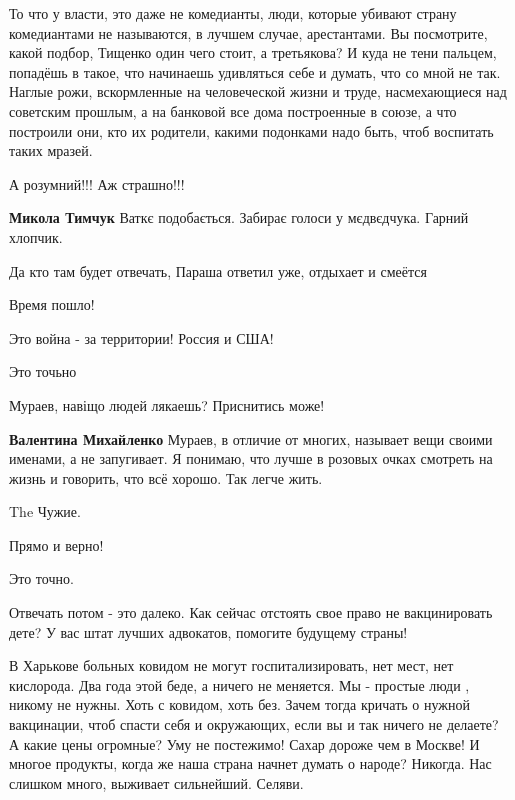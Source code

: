 \begin{itemize}
\begin{itemize}
\end{itemize} %


То что у власти, это даже не комедианты, люди, которые убивают страну
комедиантами не называются, в лучшем случае, арестантами. Вы посмотрите, какой
подбор, Тищенко один чего стоит, а третьякова? И куда не тени пальцем, попадёшь
в такое, что начинаешь удивляться себе и думать, что со мной не так. Наглые
рожи, вскормленные на человеческой жизни и труде, насмехающиеся над советским
прошлым, а на банковой все дома построенные в союзе, а что построили они, кто
их родители, какими подонками надо быть, чтоб воспитать таких мразей.

А розумний!!! Аж страшно!!!

\begin{itemize} %
\textbf{Микола Тимчук} Ваткє подобається. Забирає голоси у мєдвєдчука. Гарний хлопчик.
\end{itemize} %

Да кто там будет отвечать, Параша ответил уже, отдыхает и смеётся

Время пошло!

Это война - за территории! Россия и США!

Это точьно

Мураев, навіщо людей лякаешь? Приснитись може!

\begin{itemize} %
\textbf{Валентина Михайленко} Мураев, в отличие от многих, называет вещи своими именами, а не запугивает. Я понимаю, что лучше в розовых очках смотреть на жизнь и говорить, что всё хорошо. Так легче жить.
\end{itemize} %

The Чужие.

Прямо и верно!

Это точно.

Отвечать потом - это далеко. Как сейчас отстоять свое право не вакцинировать дете? У вас штат лучших адвокатов, помогите будущему страны!


В Харькове больных ковидом не могут госпитализировать, нет мест, нет кислорода.
Два года этой беде, а ничего не меняется. Мы - простые люди , никому не нужны.
Хоть с ковидом, хоть без. Зачем тогда кричать о нужной вакцинации, чтоб спасти
себя и окружающих, если вы и так ничего не делаете? А какие цены огромные? Уму
не постежимо! Сахар дороже чем в Москве! И многое продукты, когда же наша
страна начнет думать о народе? Никогда. Нас слишком много, выживает сильнейший.
Селяви.


\end{itemize}
